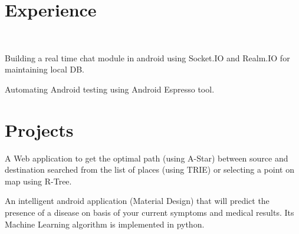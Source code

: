 \documentclass[]{hieudo-build}
\begin{document}
\begin{minipage}[t]{0.69\textwidth} 

\section{Experience}

\\
\vspace{0.9em} %
\begin{tightemize}
\item Building a real time chat module in android using Socket.IO and Realm.IO for maintaining local DB.
\item Automating Android testing using Android Espresso tool.
\end{tightemize}
\sectionsep










\section{Projects}

 
\descript{}
A Web application to get the optimal path (using A-Star) between source and destination searched from the list of places (using TRIE) or selecting a point on map using R-Tree.
\sectionsep

 
\descript{}
An intelligent android application (Material Design) that will predict the presence of a disease on basis of your current symptoms and medical results. Its Machine Learning algorithm is implemented in python.
\sectionsep


\end{minipage}
\end{document}
